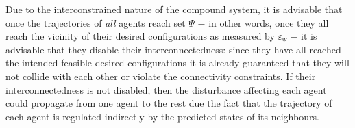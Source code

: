 Due to the interconstrained nature of the compound system, it is advisable that
once the trajectories of \textit{all} agents reach set $\Psi$ $-$ in other
words, once they all reach the vicinity of their desired configurations as
measured by $\varepsilon_{\Psi}$ $-$ it is advisable that they disable their
interconnectedness: since they have all reached the intended feasible
desired configurations it is already guaranteed that they will not collide with
each other or violate the connectivity constraints. If their interconnectedness
is not disabled, then the disturbance affecting each agent could propagate
from one agent to the rest due the fact that the trajectory of each agent
is regulated indirectly by the predicted states of its neighbours.
